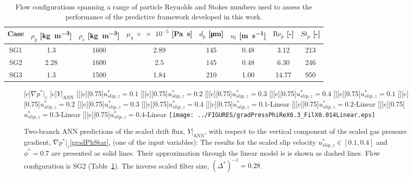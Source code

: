 \documentclass[11pt]{article}
\newcommand{\uSlipStar}{u_{slip,z}^{*}}
\newcommand{\Rep}{\text{Re}_p}
\newcommand{\gradPgStar}{\nabla p^{*}|_z}
\newcommand{\YANN}{Y|_{\text{ANN}}}
\begin{document}
\begin{table}
\centering
\begin{tabular}{cccccccc}
Case & $\rho_{g}$ [\si{\kg\per\cubic\m}] & $\rho_{s}$ [\si{\kg\per\cubic\m}] & $\mu_{g}$ $\times\num{e-5}$ [\si{\pascal\s}] & $d_{p}$ [\si{\micro\m}] & $u_{t}$ [\si{\m\per\s}] & $\Rep$ [-] & $St_{p}$ [-] \\\hline
SG1 & 1.3 & 1600 & 2.89 & 145 & 0.48 & 3.12 & 213 \\
SG2 & 2.28 & 1600 & 2.5 & 145 & 0.48 & 6.30 & 246 \\
SG3 & 1.3 & 1500 & 1.84 & 210 & 1.00 & 14.77 & 950 \\
\end{tabular}
\caption{Flow configurations spanning a range of particle Reynolds and Stokes numbers used to assess the performance of the predictive framework developed in this work.}
\label{tab:test_cases}
\end{table}

\newpage
\begin{figure}
    \centering
    [c]{$\gradPgStar$}
    [c]{$\YANN$}
    [][c][0.75]{\hspace{-0.5cm}$\uSlipStar=0.1$}
    [][c][0.75]{\hspace{-0.5cm}$\uSlipStar=0.2$}
    [][c][0.75]{\hspace{-0.5cm}$\uSlipStar=0.3$}
    [][c][0.75]{\hspace{-0.5cm}$\uSlipStar=0.4$}
    [][c][0.75]{\hspace{-3cm}$\uSlipStar=0.1$}
    [][c][0.75]{\hspace{-3cm}$\uSlipStar=0.2$}
    [][c][0.75]{\hspace{-3cm}$\uSlipStar=0.3$}
    [][c][0.75]{\hspace{-3cm}$\uSlipStar=0.4$}  
    [][c][0.75]{\hspace{-0.75cm}$\uSlipStar=0.1$-Linear}
    [][c][0.75]{\hspace{-0.75cm}$\uSlipStar=0.2$-Linear}
    [][c][0.75]{\hspace{-0.75cm}$\uSlipStar=0.3$-Linear}
    [][c][0.75]{\hspace{-0.75cm}$\uSlipStar=0.4$-Linear}      
    \hspace{-0.6cm}\texttt{[image: ../FIGURES/gradPressPhiReX6.3\_FilX0.014Linear.eps]}         
    \caption{Two-branch ANN predictions of the scaled drift flux, $\YANN$, with respect to the vertical component of the scaled gas pressure gradient, $\gradPgStar$\eqref{gradPhStar}, (one of the input variables): The results for the scaled slip velocity $\uSlipStar \in [0.1, 0.4]$ and $\phi^{*} = 0.7$ are presented as solid lines. Their approximation through the linear model is is shown as dashed lines. Flow configuration is SG2 (Table~\ref{tab:test_cases}). The inverse scaled filter size, $(\Delta^{*})^{-1}=0.28$.} \label{fig:ANNdependence}
\end{figure}
\end{document}
